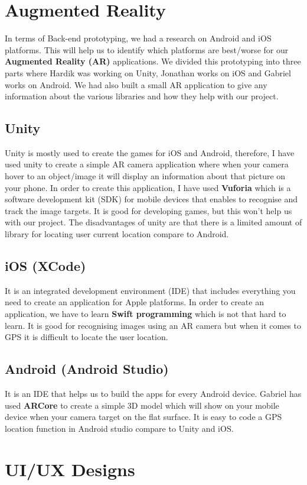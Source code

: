 
\section{Augmented Reality}
In terms of Back-end prototyping, we had a research on Android and iOS platforms. This will help us to identify which platforms are best/worse for our \textbf {Augmented Reality (AR)} applications. We divided this prototyping into three parts where Hardik was working on Unity, Jonathan works on iOS and Gabriel works on Android. We had also built a small AR application to give any information about the various libraries and how they help with our project.

\subsection{Unity}
Unity is mostly used to create the games for iOS and Android, therefore, I have used unity to create a simple AR camera application where when your camera hover to an object/image it will display an information about that picture on your phone. In order to create this application, I have used \textbf {Vuforia} which is a software development kit (SDK) for mobile devices that enables to recognise and track the image targets. It is good for developing games, but this won’t help us with our project. The disadvantages of unity are that there is a limited amount of library for locating user current location compare to Android.

\subsection{iOS (XCode)}
It is an integrated development environment (IDE) that includes everything you need to create an application for Apple platforms. In order to create an application, we have to learn \textbf {Swift programming} which is not that hard to learn. It is good for recognising images using an AR camera but when it comes to GPS it is difficult to locate the user location.

\subsection{Android (Android Studio)}
It is an IDE that helps us to build the apps for every Android device. Gabriel has used \textbf {ARCore} to create a simple 3D model which will show on your mobile device when your camera target on the flat surface. It is easy to code a GPS location function in Android studio compare to Unity and iOS.

\section{UI/UX Designs}